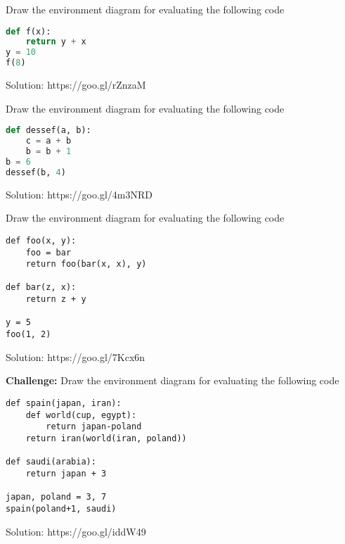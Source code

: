 \question
Draw the environment diagram for evaluating the following code
\begin{lstlisting}[language=Python]
def f(x):
    return y + x
y = 10
f(8)
\end{lstlisting}
\begin{solution}[3in]
Solution: https://goo.gl/rZnzaM
\end{solution}
\question
Draw the environment diagram for evaluating the following code
\begin{lstlisting}[language=Python]
def dessef(a, b):
    c = a + b
    b = b + 1
b = 6
dessef(b, 4)
\end{lstlisting}

\begin{solution}[.1in]
Solution: https://goo.gl/4m3NRD
\end{solution}
\newpage
\question
Draw the environment diagram for evaluating the following code
\begin{lstlisting}
def foo(x, y):
    foo = bar
    return foo(bar(x, x), y)
	
def bar(z, x):
    return z + y
	
y = 5
foo(1, 2)
\end{lstlisting}
\begin{solution}[2.5in]
Solution: 	https://goo.gl/7Kcx6n
\end{solution}

\question \textbf{Challenge:} Draw the environment diagram for evaluating the following code
\begin{lstlisting}
def spain(japan, iran):
    def world(cup, egypt):
	    return japan-poland
    return iran(world(iran, poland))

def saudi(arabia):
    return japan + 3
	
japan, poland = 3, 7
spain(poland+1, saudi)
\end{lstlisting}
\begin{solution}
Solution: 	https://goo.gl/iddW49
\end{solution}


